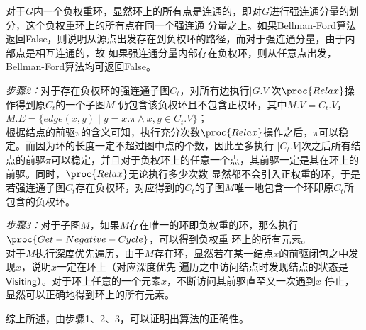 \begin{solution}
    \qquad 对于$G$内一个负权重环，显然环上的所有点是连通的，即对$G$进行强连通分量的划分，这个负权重环上的所有点在同一个强连通
    分量之上。如果Bellman-Ford算法返回False，则说明从源点出发存在到负权环的路径，而对于强连通分量，由于内部点是相互连通的，故
    如果强连通分量内部存在负权环，则从任意点出发，Bellman-Ford算法均可返回False。

    \textit{步骤2：}对于存在负权环的强连通子图$C_t$，对所有边执行$|G.V|$次$\proc{Relax}$操作得到原$C_t$的一个子图$M$
    仍包含该负权环且不包含正权环，其中$M.V=C_t.V$，$M.E=\{edge(x,y) \mid y = x.\pi\wedge x,y \in C_t.V \}$；\\
    
    \qquad 根据结点的前驱$\pi$的含义可知，执行充分次数$\proc{Relax}$操作之后，$\pi$可以稳定。而因为环的长度一定不超过图中点的个数，因此至多执行
    $|C_t.V|$次之后所有结点的前驱$\pi$可以稳定，并且对于负权环上的任意一个点，其前驱一定是其在环上的前驱。同时，$\proc{Relax}$无论执行多少次数
    显然都不会引入正权重的环，于是若强连通子图$C_t$存在负权环，对应得到的$C_t$的子图$M$唯一地包含一个环即原$C_t$所包含的负权环。

    \textit{步骤3：}对于子图$M$，如果$M$存在唯一的环即负权重的环，那么执行$\proc{Get-Negative-Cycle}$，可以得到负权重
    环上的所有元素。\\

    \qquad 对于$M$执行深度优先遍历，由于$M$存在环，显然若在某一结点$x$的前驱闭包之中发现$x$，说明$x$一定在环上（对应深度优先
    遍历之中访问结点时发现结点的状态是$\textsf{Visiting}$）。对于环上任意的一个元素$x$，不断访问其前驱直至又一次遇到$x$
    停止，显然可以正确地得到环上的所有元素。

    综上所述，由步骤1、2、3，可以证明出算法的正确性。
\end{solution}